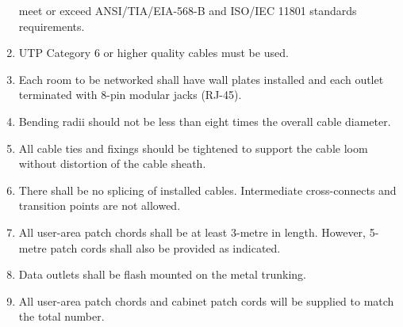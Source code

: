 \documentclass[12pt]{article}
\begin{document}
\begin{enumerate}
    meet or exceed ANSI/TIA/EIA-568-B and ISO/IEC 11801 standards requirements.
    \item UTP Category 6 or higher quality cables must be used.
    \item Each room to be networked shall have wall plates installed and each outlet terminated with 8-pin
    modular jacks (RJ-45).
    \item Bending radii should not be less than eight times the overall cable diameter.
    \item All cable ties and fixings should be tightened to support the cable loom without distortion of the
    cable sheath.
    \item There shall be no splicing of installed cables. Intermediate cross-connects and transition points are
    not allowed.
    \item All user-area patch chords shall be at least 3-metre in length. However, 5-metre patch cords shall
    also be provided as indicated.
    \item Data outlets shall be flash mounted on the metal trunking.
    \item All user-area patch chords and cabinet patch cords will be supplied to match the total number.
\end{enumerate}
\end{document}
